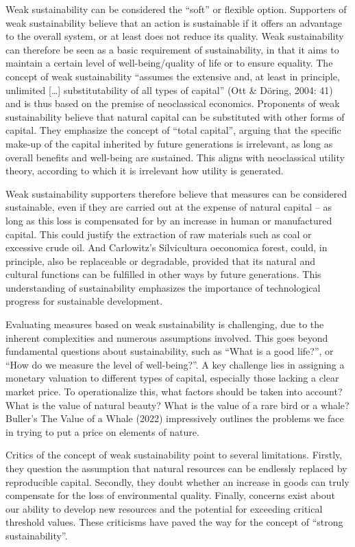 \documentclass[
  a4paper,
  openany]{book}
\begin{document}
Weak sustainability can be considered the ``soft'' or flexible option.
Supporters of weak sustainability believe that an action is sustainable
if it offers an advantage to the overall system, or at least does not
reduce its quality. Weak sustainability can therefore be seen as a basic
requirement of sustainability, in that it aims to maintain a certain
level of well-being/quality of life or to ensure equality. The concept
of weak sustainability ``assumes the extensive and, at least in
principle, unlimited {[}\ldots{]} substitutability of all types of
capital'' (Ott \& Döring, 2004: 41) and is thus based on the premise of
neoclassical economics. Proponents of weak sustainability believe that
natural capital can be substituted with other forms of capital. They
emphasize the concept of ``total capital'', arguing that the specific
make-up of the capital inherited by future generations is irrelevant, as
long as overall benefits and well-being are sustained. This aligns with
neoclassical utility theory, according to which it is irrelevant how
utility is generated.

Weak sustainability supporters therefore believe that measures can be
considered sustainable, even if they are carried out at the expense of
natural capital -- as long as this loss is compensated for by an
increase in human or manufactured capital. This could justify the
extraction of raw materials such as coal or excessive crude oil. And
Carlowitz's Silvicultura oeconomica forest, could, in principle, also be
replaceable or degradable, provided that its natural and cultural
functions can be fulfilled in other ways by future generations. This
understanding of sustainability emphasizes the importance of
technological progress for sustainable development.

Evaluating measures based on weak sustainability is challenging, due to
the inherent complexities and numerous assumptions involved. This goes
beyond fundamental questions about sustainability, such as ``What is a
good life?'', or ``How do we measure the level of well-being?''. A key
challenge lies in assigning a monetary valuation to different types of
capital, especially those lacking a clear market price. To
operationalize this, what factors should be taken into account? What is
the value of natural beauty? What is the value of a rare bird or a
whale? Buller's The Value of a Whale (2022) impressively outlines the
problems we face in trying to put a price on elements of nature.

Critics of the concept of weak sustainability point to several
limitations. Firstly, they question the assumption that natural
resources can be endlessly replaced by reproducible capital. Secondly,
they doubt whether an increase in goods can truly compensate for the
loss of environmental quality. Finally, concerns exist about our ability
to develop new resources and the potential for exceeding critical
threshold values. These criticisms have paved the way for the concept of
``strong sustainability''.
\end{document}
